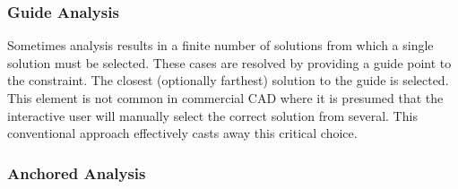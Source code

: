 \documentclass[]{report}
\begin{document}
\subsubsection{Guide Analysis}

Sometimes analysis results in a finite number of solutions 
from which a single solution must be selected. 
These cases are resolved by providing a guide point to the constraint. 
The closest (optionally farthest) solution to the guide is selected. 
This element is not common in commercial CAD where it is presumed that the interactive user will manually select the correct solution from several. 
This conventional approach effectively casts away this critical choice.

\subsubsection{Anchored Analysis}
\end{document}
